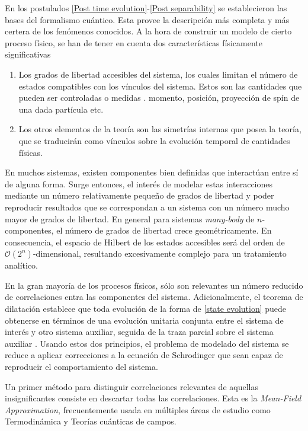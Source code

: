 En los postulados \ref{Post time evolution}-\ref{Post separability} se establecieron las bases del formalismo cuántico. Esta provee la descripción más completa y más certera de los fenómenos conocidos. A la hora de construir un modelo de cierto proceso físico, se han de tener en cuenta dos características físicamente significativas

\begin{enumerate}
    \item Los grados de libertad accesibles del sistema, los cuales limitan el número de estados compatibles con los vínculos del sistema. Estos son las cantidades que pueden ser controladas o medidas \eg. momento, posición, proyección de spín de una dada partícula etc. 
    
    \item Los otros elementos de la teoría son las simetrías internas que posea la teoría, que se traducirán como vínculos sobre la evolución temporal de cantidades físicas. 
\end{enumerate}

En muchos sistemas, existen componentes bien definidas que interactúan entre sí de alguna forma. Surge entonces, el interés de modelar estas interacciones mediante un número relativamente pequeño de grados de libertad y poder reproducir resultados que se correspondan a un sistema con un número mucho mayor de grados de libertad. En general para sistemas \textit{many-body} de $n$-componentes, el número de grados de libertad crece geométricamente. En consecuencia, el espacio de Hilbert de los estados accesibles será del orden de $\mathcal{O}(2^n)$-dimensional, resultando excesivamente complejo para un tratamiento analítico.

En la gran mayoría de los procesos físicos, sólo son relevantes un número reducido de correlaciones entra las componentes del sistema. Adicionalmente, el teorema de dilatación establece que toda evolución de la forma de \eqref{state evolution} puede obtenerse en términos de una evolución unitaria conjunta entre el sistema de interés y otro sistema auxiliar, seguida de la traza parcial sobre el sistema auxiliar \cite{Stinespring,KasparovabtSt.}. Usando estos dos principios, el problema de modelado del sistema se reduce a aplicar correcciones a la ecuación de Schrodinger que sean capaz de reproducir el comportamiento del sistema.

Un primer método para distinguir correlaciones relevantes de aquellas insignificantes consiste en descartar todas las correlaciones. Esta es la \textit{Mean-Field Approximation}, frecuentemente usada en múltiples áreas de estudio como Termodinámica y Teorías cuánticas de campos.

